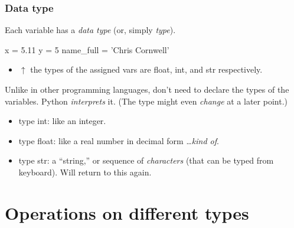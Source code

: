\documentclass{beamer}
\newenvironment{codeblock}
    {\hfill\begin{beamerboxesrounded}[lower=codecol, width=0.8\textwidth]
    \medskip

    }
    { 
    \end{beamerboxesrounded}\hfill
    }
\theoremstyle{example}
\begin{document}
\begin{frame}[fragile]
\frametitle{Data type}

Each variable has a \emph{data type} (or, simply \emph{type}). 

\begin{codeblock}

\begin{python}
x = 5.11
y = 5
name_full = 'Chris Cornwell'
\end{python}

\end{codeblock}

\begin{itemize}
	\item[] $\uparrow$ the types of the assigned vars are {\ttb float}, {\ttb int}, and {\ttb str} respectively.
\end{itemize}

Unlike in other programming languages, don't need to declare the types of the variables. Python \emph{interprets} it. (The type might even \emph{change} at a later point.)

\begin{itemize}
	\item type {\ttb int}: like an integer.
	\item type {\ttb float}: like a real number in decimal form \ldots \emph{kind of}.
	\item type {\ttb str}: a ``string,'' or sequence of \emph{characters} (that can be typed from keyboard). Will return to this again.
\end{itemize}
\end{frame}

\section{Operations on different types}
\end{document}
